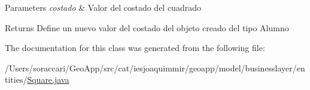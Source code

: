 \begin{DoxyParams}{Parameters}
{\em costado} & Valor del costado del cuadrado \\
\hline
\end{DoxyParams}
\begin{DoxyReturn}{Returns}
Define un nuevo valor del costado del objeto creado del tipo Alumno 
\end{DoxyReturn}


The documentation for this class was generated from the following file\+:\begin{DoxyCompactItemize}
\item 
/\+Users/soraccari/\+Geo\+App/src/cat/iesjoaquimmir/geoapp/model/businesslayer/entities/\mbox{\hyperlink{_square_8java}{Square.\+java}}\end{DoxyCompactItemize}
